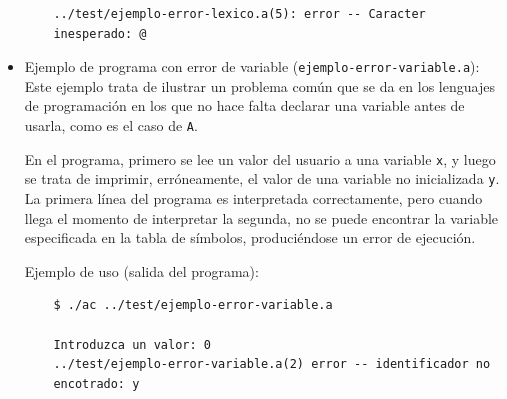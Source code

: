 \documentclass[12pt]{article}
\begin{document}
\begin{itemize}
\begin{verbatim}
    ../test/ejemplo-error-lexico.a(5): error -- Caracter
    inesperado: @
    \end{verbatim}
    
    \item Ejemplo de programa con error de variable (\texttt{ejemplo-error-variable.a}): Este ejemplo trata de ilustrar un problema común que se da en los lenguajes de programación en los que no hace falta declarar una variable antes de usarla, como es el caso de \texttt{A}.\par
    En el programa, primero se lee un valor del usuario a una variable \texttt{x}, y luego se trata de imprimir, erróneamente, el valor de una variable no inicializada \texttt{y}. La primera línea del programa es interpretada correctamente, pero cuando llega el momento de interpretar la segunda, no se puede encontrar la variable especificada en la tabla de símbolos, produciéndose un error de ejecución.\par
    Ejemplo de uso (salida del programa):
    \begin{verbatim}
    $ ./ac ../test/ejemplo-error-variable.a
    
    Introduzca un valor: 0
    ../test/ejemplo-error-variable.a(2) error -- identificador no
    encotrado: y
    \end{verbatim}
\end{itemize}
\end{document}
